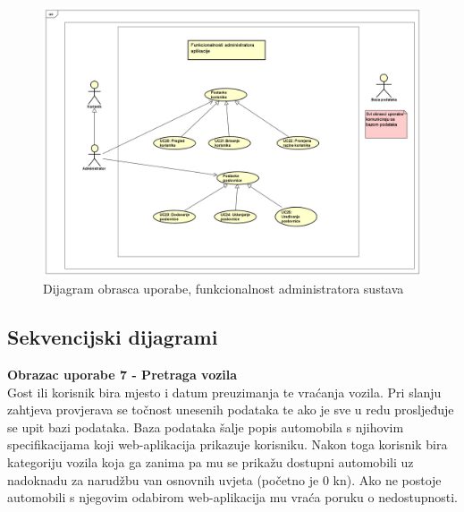                \newpage
                \begin{figure}[hp]
                    \centering
                    \includegraphics[width=15cm]{slike/UseCaseDiagram2.png}
                    \caption{Dijagram obrasca uporabe, funkcionalnost administratora sustava}
                    \label{fig:useCase-2}
                \end{figure}
                 
                
                \eject
               
				
			\subsection{Sekvencijski dijagrami}
				

				\noindent\textbf{Obrazac uporabe 7 - Pretraga vozila}\\
				
				\noindent Gost ili korisnik bira mjesto i datum preuzimanja te
				vraćanja vozila. Pri slanju zahtjeva provjerava se točnost
				unesenih podataka te ako je sve u redu prosljeđuje se upit bazi
				podataka. Baza podataka šalje popis automobila s njihovim
				specifikacijama koji web-aplikacija prikazuje korisniku. Nakon
				toga korisnik bira kategoriju vozila koja ga zanima pa mu se
				prikažu dostupni automobili uz nadoknadu za narudžbu van
				osnovnih uvjeta (početno je 0 kn). Ako ne postoje automobili s
				njegovim odabirom web-aplikacija mu vraća poruku o
				nedostupnosti.
				
